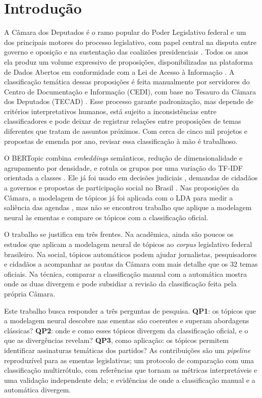 \documentclass[12pt]{article}
\begin{document}
\section{Introdução}

A Câmara dos Deputados é o ramo popular do Poder Legislativo federal e um dos principais motores do processo legislativo, com papel central na disputa entre governo e oposição e na sustentação das coalizões presidenciais \citep{figueiredo1999executivo}. Todos os anos ela produz um volume expressivo de proposições, disponibilizadas na plataforma de Dados Abertos em conformidade com a Lei de Acesso à Informação \citep{brasil2011lei12527}. A classificação temática dessas proposições é feita manualmente por servidores do Centro de Documentação e Informação (CEDI), com base no Tesauro da Câmara dos Deputados (TECAD) \citep{camara2013atomesa, braga2017tecad}. Esse processo garante padronização, mas depende de critérios interpretativos humanos, está sujeito a inconsistências entre classificadores e pode deixar de registrar relações entre proposições de temas diferentes que tratam de assuntos próximos. Com cerca de cinco mil projetos e propostas de emenda por ano, revisar essa classificação à mão é trabalhoso.

O BERTopic combina \textit{embeddings} semânticos, redução de dimensionalidade e agrupamento por densidade, e rotula os grupos por uma variação do TF-IDF orientada a classes \citep{grootendorst2022bertopic}. Ele já foi usado em decisões judiciais \citep{silveira2021topic}, demandas de cidadãos a governos \citep{tang2024analyzing} e propostas de participação social no Brasil \citep{ferreira2025semantic}. Nas proposições da Câmara, a modelagem de tópicos já foi aplicada com o LDA para medir a saliência das agendas \citep{batista2020quais}, mas não se encontrou trabalho que aplique a modelagem neural às ementas e compare os tópicos com a classificação oficial.

O trabalho se justifica em três frentes. Na acadêmica, ainda são poucos os estudos que aplicam a modelagem neural de tópicos ao \textit{corpus} legislativo federal brasileiro. Na social, tópicos automáticos podem ajudar jornalistas, pesquisadores e cidadãos a acompanhar as pautas da Câmara com mais detalhe que os 32 temas oficiais. Na técnica, comparar a classificação manual com a automática mostra onde as duas divergem e pode subsidiar a revisão da classificação feita pela própria Câmara.

Este trabalho busca responder a três perguntas de pesquisa. \textbf{QP1}: os tópicos que a modelagem neural descobre nas ementas são coerentes e superam abordagens clássicas? \textbf{QP2}: onde e como esses tópicos divergem da classificação oficial, e o que as divergências revelam? \textbf{QP3}, como aplicação: os tópicos permitem identificar assinaturas temáticas dos partidos? As contribuições são um \textit{pipeline} reproduzível para as ementas legislativas; um protocolo de comparação com uma classificação multirrótulo, com referências que tornam as métricas interpretáveis e uma validação independente dela; e evidências de onde a classificação manual e a automática divergem.
\end{document}

